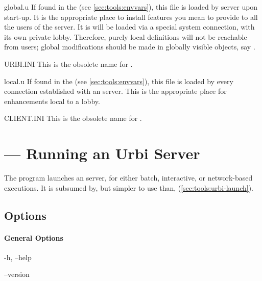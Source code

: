 \begin{files}
\item[global.u] If found in the  (see
  \autoref{sec:tools:envvars}), this file is loaded by \urbi server upon
  start-up.  It is the appropriate place to install features you
  mean to provide to all the users of the server.  It is will be
  loaded via a special system connection, with its own private lobby.
  Therefore, purely local definitions will not be reachable from
  users; global modifications should be made in globally visible
  objects, say .

\item[URBI.INI] This is the obsolete name for .

\item[local.u] If found in the  (see
  \autoref{sec:tools:envvars}), this file is loaded by every
  connection established with an \urbi server.  This is the
  appropriate place for enhancements local to a lobby.

\item[CLIENT.INI] This is the obsolete name for .
\end{files}

\section{ --- Running an Urbi Server}
\label{sec:tools:urbi}

The  program launches an \urbi server, for either batch,
interactive, or network-based executions.  It is subsumed by, but
simpler to use than, 
(\autoref{sec:tools:urbi-launch}).

\subsection{Options}

\paragraph{General Options}

\begin{options}
\item[-h, --help] \optionHelp
\item[--version] \optionVersion
\end{options}

